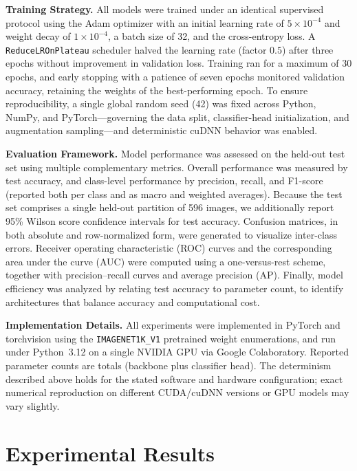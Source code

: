 \documentclass[conference]{IEEEtran}
\begin{document}
\textbf{Training Strategy.}
All models were trained under an identical supervised protocol using the Adam optimizer with an initial learning rate of $5\times10^{-4}$ and weight decay of $1\times10^{-4}$, a batch size of 32, and the cross-entropy loss. A \texttt{ReduceLROnPlateau} scheduler halved the learning rate (factor $0.5$) after three epochs without improvement in validation loss. Training ran for a maximum of 30 epochs, and early stopping with a patience of seven epochs monitored validation accuracy, retaining the weights of the best-performing epoch. To ensure reproducibility, a single global random seed (42) was fixed across Python, NumPy, and PyTorch---governing the data split, classifier-head initialization, and augmentation sampling---and deterministic cuDNN behavior was enabled.

\textbf{Evaluation Framework.}
Model performance was assessed on the held-out test set using multiple complementary metrics. Overall performance was measured by test accuracy, and class-level performance by precision, recall, and F1-score (reported both per class and as macro and weighted averages). Because the test set comprises a single held-out partition of 596 images, we additionally report 95\% Wilson score confidence intervals for test accuracy. Confusion matrices, in both absolute and row-normalized form, were generated to visualize inter-class errors. Receiver operating characteristic (ROC) curves and the corresponding area under the curve (AUC) were computed using a one-versus-rest scheme, together with precision--recall curves and average precision (AP). Finally, model efficiency was analyzed by relating test accuracy to parameter count, to identify architectures that balance accuracy and computational cost.

\textbf{Implementation Details.}
All experiments were implemented in PyTorch and torchvision using the \texttt{IMAGENET1K\_V1} pretrained weight enumerations, and run under Python~3.12 on a single NVIDIA GPU via Google Colaboratory. Reported parameter counts are totals (backbone plus classifier head). The determinism described above holds for the stated software and hardware configuration; exact numerical reproduction on different CUDA/cuDNN versions or GPU models may vary slightly.

\section{Experimental Results}
\end{document}
